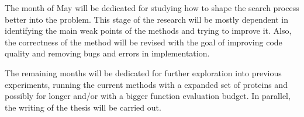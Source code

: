 The month of May will be dedicated for studying how to shape the search
process better into the problem. This stage of the research will be
mostly dependent in identifying the main weak points of the methods and trying
to improve it. Also, the correctness of the method will be revised with the goal
of improving code quality and removing bugs and errors in implementation.

The remaining months will be dedicated for further exploration into previous
experiments, running the current methods with a expanded set of proteins and
possibly for longer and/or with a bigger function evaluation budget. In parallel,
the writing of the thesis will be carried out.

